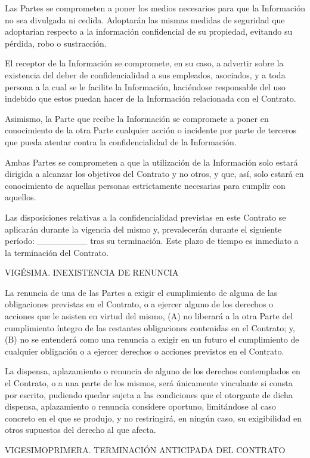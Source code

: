 \documentclass[a4paper,11pt]{report}
\begin{document}
Las Partes se comprometen a poner los medios necesarios para que la
Información no sea divulgada ni cedida. Adoptarán las mismas medidas de
seguridad que adoptarían respecto a la información confidencial de su
propiedad, evitando su pérdida, robo o sustracción.

El receptor de la Información se compromete, en su caso, a advertir
sobre la existencia del deber de confidencialidad a sus empleados,
asociados, y a toda persona a la cual se le facilite la Información,
haciéndose responsable del uso indebido que estos puedan hacer de la
Información relacionada con el Contrato.

Asimismo, la Parte que recibe la Información se compromete a poner en
conocimiento de la otra Parte cualquier acción o incidente por parte de
terceros que pueda atentar contra la confidencialidad de la Información.

Ambas Partes se comprometen a que la utilización de la Información solo
estará dirigida a alcanzar los objetivos del Contrato y no otros, y que,
así, solo estará en conocimiento de aquellas personas estrictamente
necesarias para cumplir con aquellos.

Las disposiciones relativas a la confidencialidad previstas en este
Contrato se aplicarán durante la vigencia del mismo y, prevalecerán
durante el siguiente período: \_\_\_\_\_\_\_\_ tras su terminación. Este plazo
de tiempo es inmediato a la terminación del Contrato.

VIGÉSIMA. INEXISTENCIA DE RENUNCIA

La renuncia de una de las Partes a exigir el cumplimiento de alguna de
las obligaciones previstas en el Contrato, o a ejercer alguno de los
derechos o acciones que le asisten en virtud del mismo, (A) no liberará
a la otra Parte del cumplimiento íntegro de las restantes obligaciones
contenidas en el Contrato; y, (B) no se entenderá como una renuncia a
exigir en un futuro el cumplimiento de cualquier obligación o a ejercer
derechos o acciones previstos en el Contrato.

La dispensa, aplazamiento o renuncia de alguno de los derechos
contemplados en el Contrato, o a una parte de los mismos, será
únicamente vinculante si consta por escrito, pudiendo quedar sujeta a
las condiciones que el otorgante de dicha dispensa, aplazamiento o
renuncia considere oportuno, limitándose al caso concreto en el que se
produjo, y no restringirá, en ningún caso, su exigibilidad en otros
supuestos del derecho al que afecta.

VIGESIMOPRIMERA. TERMINACIÓN ANTICIPADA DEL CONTRATO
\end{document}
